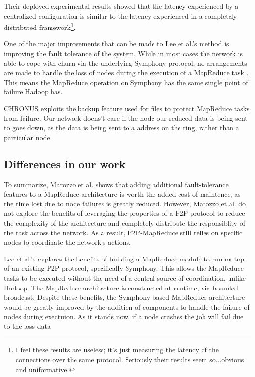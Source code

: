 \documentclass[conference, compsocconf, letterpaper]{IEEEtran}
\begin{document}
Their deployed experimental results showed that the latency experienced by a centralized configuration is similar to the latency experienced in a completely distributed framework\footnote{I feel these results are useless; it's just measuring the latency of the connections over the same protocol.  Seriously their results seem so...obvious and uniformative.}.

One of the major improvements that can be made to Lee et al.'s method is improving the fault tolerance of the system.  While in most cases the network is able to cope with churn via the underlying Symphony protocol, no arrangements are made to handle the loss of nodes during the execution of a MapReduce task \cite{leemap}.  This means the MapReduce operation on Symphony has the same single point of failure Hadoop has. 

CHRONUS exploits the backup feature used for files to protect MapReduce tasks from failure.  Our network doens't care if the node  our reduced data is being sent to goes down, as the data is being sent to a address on the ring, rather than a particular node.

\subsection{Differences in our work}


To summarize, Marozzo et al. \cite{marozzo2012p2p} shows that adding additional fault-tolerance features to a MapReduce architecture is worth the added cost of maintence, as the time lost due to node failures is greatly reduced.  However, Marozzo et al. do not explore the benefits of leveraging the properties of a P2P protocol to reduce the complexity of the architecture and completely distribute the responsiblity of the task across the network.  As a result, P2P-MapReduce still relies on specific nodes to coordinate the network's actions.

Lee et al.'s \cite{leemap} explores the benefits of building a MapReduce module to run on top of an existing P2P protocol, specifically Symphony.  This allows the MapReduce tasks to be executed without the need of a central source of coordination, unlike Hadoop.  The MapReduce architecture is constructed at runtime, via bounded broadcast. Despite these benefits, the Symphony based MapReduce architecture would be greatly improved by the addition of components to handle the failure of nodes during exectuion.  As it stands now, if a node crashes the job will fail due to the loss data
\end{document}
